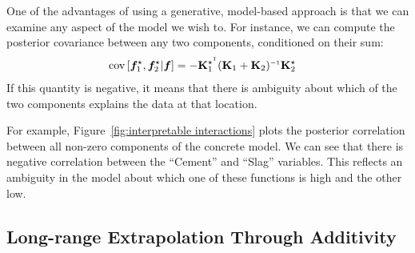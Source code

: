 One of the advantages of using a generative, model-based approach is that we can examine any aspect of the model we wish to.
For instance, we can compute the posterior covariance between any two components, conditioned on their sum:
%
\begin{align}
\covargs{ \vf_1^\star}{\vf_2^\star | \vf } 
& = - \vK_1^{\star\tra} (\vK_1 + \vK_2)\inv \vK_2^\star
\label{eq:post-component-cov}
\end{align}
%
If this quantity is negative, it means that there is ambiguity about which of the two components explains the data at that location.

For example, Figure~\ref{fig:interpretable interactions} plots the posterior correlation between all non-zero components of the concrete model.
We can see that there is negative correlation between the ``Cement'' and ``Slag'' variables.
This reflects an ambiguity in the model about which one of these functions is high and the other low.







\subsection{Long-range Extrapolation Through Additivity}

